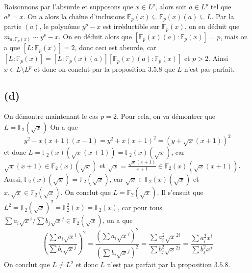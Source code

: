 \documentclass{article}
\newcommand{\F}{\mathbb{F}}
\begin{document}
Raisonnons par l'absurde et supposons que $x \in L^p$, alors soit $a \in L^p$
tel que $a^p = x$. On a alors la chaîne d'inclusions
$\F_p(x) \subseteq \F_p(x)(a) \subseteq L$.
Par la partie $(a)$, le polynôme $y^p - x$ est irréductible sur $\F_p(x)$, on 
en déduit que $m_{a, \F_p(x)} \sim y^p - x$. On en déduit alors que
$[\F_p(x)(a) : \F_p(x)] = p$, mais on a que $[L : \F_p(x)] = 2$, donc ceci est
absurde, car $[L:\F_p(x)] = [L:\F_p(x)(a)][\F_p(x)(a):\F_p(x)]$ et $p > 2$.
Ainsi $x \in L\setminus L^p$ et donc on conclut par la proposition 3.5.8 que
$L$ n'est pas parfait.

\subsection*{(d)}

On démontre maintenant le cas $p = 2$.
Pour cela, on va démontrer que $L = \F_2(\sqrt{x})$
On a que
\begin{equation*}
	y^2 - x(x+1)(x-1) = y^2 + x(x+1)^2 = (y + \sqrt{x}(x+1))^2
\end{equation*}
et donc
$L = \F_2(x)(\sqrt{x}(x+1)) = \F_2(x)(\sqrt{x})$, car
$\sqrt{x}(x+1) \in \F_2(x)(\sqrt{x})$ et
$\sqrt{x} = \frac{\sqrt{x}(x+1)}{x+1} \in \F_2(x)(\sqrt{x}(x+1))$.
Aussi, $\F_2(x)(\sqrt{x}) = \F_2(\sqrt{x})$, car 
$\sqrt{x} \in \F_2(x)(\sqrt{x})$ et $x, \sqrt{x} \in \F_2(\sqrt{x})$.
On conclut que $L = \F_2(\sqrt{x})$.
Il s'ensuit que $L^2 = \F_2(\sqrt{x})^2 = \F_2^2(x) = \F_2(x)$,
car pour tous
$\sum a_i\sqrt{x}^i / \sum b_j\sqrt{x}^j \in \F_2(\sqrt{x})$,
on a que
\begin{equation*}
	\left(\frac{\sum a_i\sqrt{x}^i}{\sum b_i\sqrt{x}^j}\right)^2
	= \frac{\left(\sum a_i\sqrt{x}^i\right)^2}
	{\left(\sum b_i\sqrt{x}^j\right)^2}
	= \frac{\sum a_i^2 \sqrt{x}^{2i}}{\sum b_j^2\sqrt{x}^{2j}}
	= \frac{\sum a_i^2 x^i}{\sum b_j^2x^j}
\end{equation*}
On conclut que $L \neq L^2$ et donc $L$
n'est pas parfait par la proposition $3.5.8$.
\end{document}
